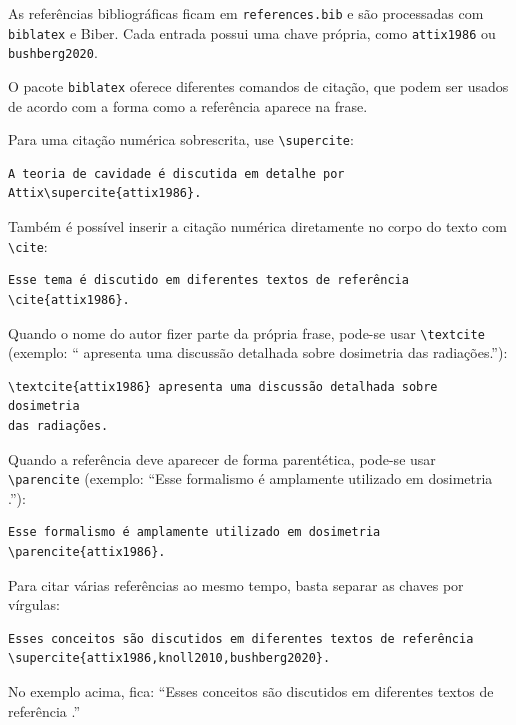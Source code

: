 As referências bibliográficas ficam em \verb|references.bib| e são processadas com \verb|biblatex| e Biber. Cada entrada possui uma chave própria, como \verb|attix1986| ou \verb|bushberg2020|.

O pacote \verb|biblatex| oferece diferentes comandos de citação, que podem ser usados de acordo com a forma como a referência aparece na frase.

Para uma citação numérica sobrescrita, use \verb|\supercite|:

\begin{verbatim}
A teoria de cavidade é discutida em detalhe por Attix\supercite{attix1986}.
\end{verbatim}

Também é possível inserir a citação numérica diretamente no corpo do texto com \verb|\cite|:

\begin{verbatim}
Esse tema é discutido em diferentes textos de referência \cite{attix1986}.
\end{verbatim}

Quando o nome do autor fizer parte da própria frase, pode-se usar \verb|\textcite| (exemplo: ``\textcite{attix1986} apresenta uma discussão detalhada sobre dosimetria das radiações.''):

\begin{verbatim}
\textcite{attix1986} apresenta uma discussão detalhada sobre dosimetria
das radiações.
\end{verbatim}

Quando a referência deve aparecer de forma parentética, pode-se usar \verb|\parencite| (exemplo: ``Esse formalismo é amplamente utilizado em dosimetria \parencite{attix1986}.''):

\begin{verbatim}
Esse formalismo é amplamente utilizado em dosimetria \parencite{attix1986}.
\end{verbatim}

Para citar várias referências ao mesmo tempo, basta separar as chaves por vírgulas:

\begin{verbatim}
Esses conceitos são discutidos em diferentes textos de referência
\supercite{attix1986,knoll2010,bushberg2020}.
\end{verbatim}

No exemplo acima, fica: ``Esses conceitos são discutidos em diferentes textos de referência \supercite{attix1986,knoll2010,bushberg2020}.''

